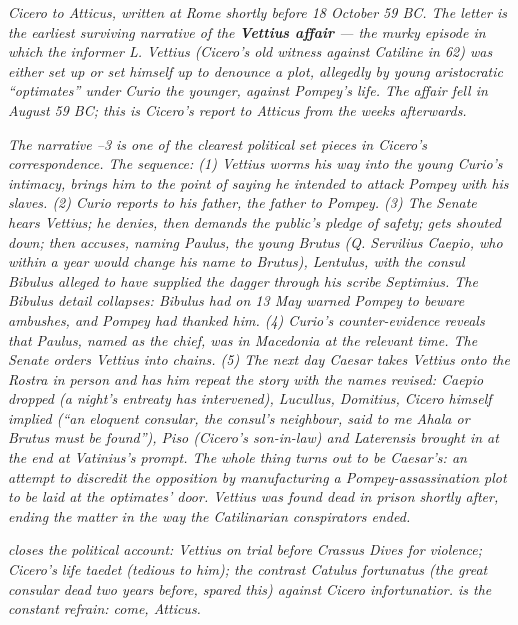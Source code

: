 
\textit{Cicero to Atticus, written at Rome shortly before 18
October 59 BC. The letter is the earliest surviving narrative
of the \textbf{Vettius affair} --- the murky episode in which
the informer L. Vettius (Cicero's old witness against Catiline
in 62) was either set up or set himself up to denounce a
plot, allegedly by young aristocratic ``optimates'' under
Curio the younger, against Pompey's life. The affair fell in
August 59 BC; this is Cicero's report to Atticus from the
weeks afterwards.}

\textit{The narrative --3 is one of the
clearest political set pieces in Cicero's correspondence. The
sequence: (1) Vettius worms his way into the young Curio's
intimacy, brings him to the point of saying he intended to
attack Pompey with his slaves. (2) Curio reports to his
father, the father to Pompey. (3) The Senate hears Vettius;
he denies, then demands the public's pledge of safety; gets
shouted down; then accuses, naming Paulus, the young Brutus
(Q. Servilius Caepio, who within a year would change his name
to Brutus), Lentulus, with the consul Bibulus alleged to have
supplied the dagger through his scribe Septimius. The Bibulus
detail collapses: Bibulus had on 13 May warned Pompey to
beware ambushes, and Pompey had thanked him. (4) Curio's
counter-evidence reveals that Paulus, named as the chief, was
in Macedonia at the relevant time. The Senate orders Vettius
into chains. (5) The next day Caesar takes Vettius onto the
Rostra in person and has him repeat the story with the names
revised: Caepio dropped (a night's entreaty has intervened),
Lucullus, Domitius, Cicero himself implied (``an eloquent
consular, the consul's neighbour, said to me Ahala or Brutus
must be found''), Piso (Cicero's son-in-law) and Laterensis
brought in at the end at Vatinius's prompt. The whole thing
turns out to be Caesar's: an attempt to discredit the
opposition by manufacturing a Pompey-assassination plot to be
laid at the optimates' door. Vettius was found dead in
prison shortly after, ending the matter in the way the
Catilinarian conspirators ended.}

\textit{ closes the political account: Vettius
on trial before Crassus Dives for violence; Cicero's life
\textit{taedet} (tedious to him); the contrast Catulus
\textit{fortunatus} (the great consular dead two years before,
spared this) against Cicero \textit{infortunatior}.  is the constant refrain: come, Atticus.}
